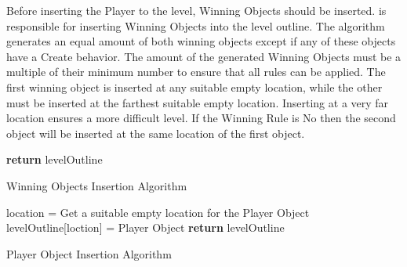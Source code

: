 Before inserting the Player to the level, Winning Objects should be inserted.  is responsible for inserting Winning Objects into the level outline. The algorithm generates an equal amount of both winning objects except if any of these objects have a Create behavior. The amount of the generated Winning Objects must be a multiple of their minimum number to ensure that all rules can be applied. The first winning object is inserted at any suitable empty location, while the other must be inserted at the farthest suitable empty location. Inserting at a very far location ensures a more difficult level. If the Winning Rule is No then the second object will be inserted at the same location of the first object.\\

\begin{algorithm}[H]
	\BlankLine
	\BlankLine
	\BlankLine
	\textbf{return} levelOutline\;
	\caption{Winning Objects Insertion Algorithm}
	\label{Algorithm:winningObjects}
\end{algorithm}

\begin{algorithm}[H]
	\BlankLine
	location = Get a suitable empty location for the Player Object\;
	levelOutline[loction] = Player Object\;
	\BlankLine
	\textbf{return} levelOutline\;
	\caption{Player Object Insertion Algorithm}
	\label{Algorithm:playerObject}
\end{algorithm}


